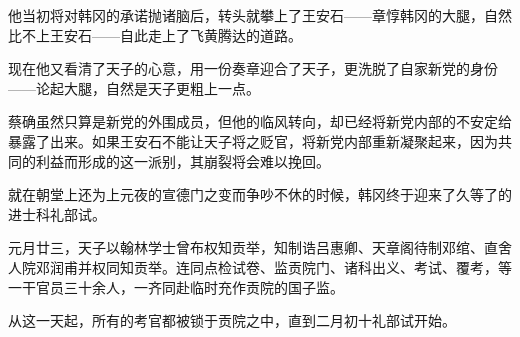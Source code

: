 他当初将对韩冈的承诺抛诸脑后，转头就攀上了王安石——章惇韩冈的大腿，自然比不上王安石——自此走上了飞黄腾达的道路。

现在他又看清了天子的心意，用一份奏章迎合了天子，更洗脱了自家新党的身份——论起大腿，自然是天子更粗上一点。

蔡确虽然只算是新党的外围成员，但他的临风转向，却已经将新党内部的不安定给暴露了出来。如果王安石不能让天子将之贬官，将新党内部重新凝聚起来，因为共同的利益而形成的这一派别，其崩裂将会难以挽回。

就在朝堂上还为上元夜的宣德门之变而争吵不休的时候，韩冈终于迎来了久等了的进士科礼部试。

元月廿三，天子以翰林学士曾布权知贡举，知制诰吕惠卿、天章阁待制邓绾、直舍人院邓润甫并权同知贡举。连同点检试卷、监贡院门、诸科出义、考试、覆考，等一干官员三十余人，一齐同赴临时充作贡院的国子监。

从这一天起，所有的考官都被锁于贡院之中，直到二月初十礼部试开始。

